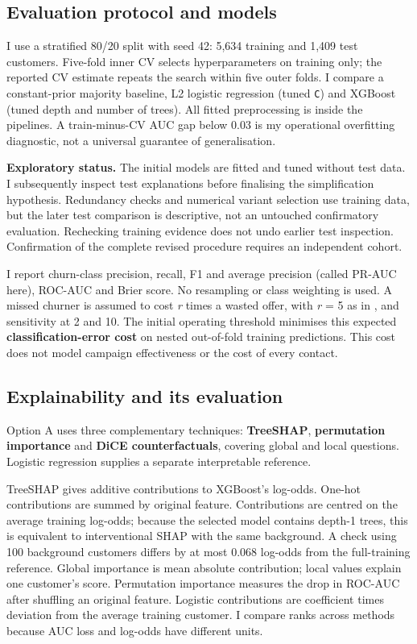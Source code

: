 \documentclass[10pt,a4paper]{article}
\begin{document}
\subsection{Evaluation protocol and
models}\label{evaluation-protocol-and-models}

I use a stratified 80/20 split with seed 42: 5,634 training and 1,409
test customers. Five-fold inner CV selects hyperparameters on training
only; the reported CV estimate repeats the search within five outer
folds. I compare a constant-prior majority baseline, L2 logistic
regression (tuned \texttt{C}) and XGBoost (tuned depth and number of
trees). All fitted preprocessing is inside the pipelines. A
train-minus-CV AUC gap below 0.03 is my operational overfitting
diagnostic, not a universal guarantee of generalisation.

\textbf{Exploratory status.} The initial models are fitted and tuned
without test data. I subsequently inspect test explanations before
finalising the simplification hypothesis. Redundancy checks and
numerical variant selection use training data, but the later test
comparison is descriptive, not an untouched confirmatory evaluation.
Rechecking training evidence does not undo earlier test inspection.
Confirmation of the complete revised procedure requires an independent
cohort.

I report churn-class precision, recall, F1 and average precision
(called PR-AUC here), ROC-AUC and Brier score. No resampling or class
weighting is used. A missed churner is assumed to cost \emph{r} times a
wasted offer, with \emph{r} = 5 as in \cite{elattar2026}, and sensitivity at 2 and
10. The initial operating threshold minimises this expected
\textbf{classification-error cost} on nested out-of-fold training
predictions. This cost does not model campaign effectiveness or the cost
of every contact.

\subsection{Explainability and its
evaluation}\label{explainability-and-its-evaluation}

Option A uses three complementary techniques: \textbf{TreeSHAP},
\textbf{permutation importance} and \textbf{DiCE counterfactuals},
covering global and local questions. Logistic regression supplies a
separate interpretable reference.

TreeSHAP \cite{lundberg2017,lundberg2020} gives additive contributions to XGBoost's log-odds.
One-hot contributions are summed by original feature. Contributions are
centred on the average training log-odds; because the selected model
contains depth-1 trees, this is equivalent to interventional SHAP with
the same background. A check using 100 background customers differs by
at most 0.068 log-odds from the full-training reference. Global
importance is mean absolute contribution; local values explain one
customer's score. Permutation importance \cite{fisher2019} measures the drop in
ROC-AUC after shuffling an original feature. Logistic contributions are
coefficient times deviation from the average training customer. I
compare ranks across methods because AUC loss and log-odds have
different units.
\end{document}
